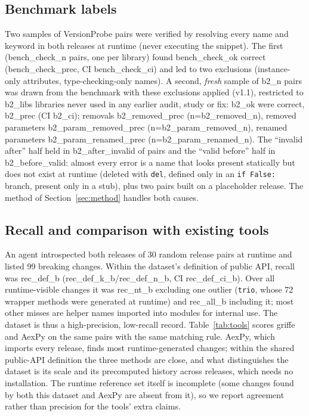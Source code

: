 \documentclass[10pt,twocolumn,letterpaper]{article}
\begin{document}
\subsection{Benchmark labels}\label{sec:benchlabels}
Two samples of VersionProbe pairs were verified by resolving every name and keyword in both releases at runtime
(never executing the snippet). The first ({{bench_check_n}} pairs, one per library) found {{bench_check_ok}} correct
({{bench_check_prec}}, CI {{bench_check_ci}}) and led to two exclusions (instance-only attributes, type-checking-only
names). A second, \emph{fresh} sample of {{b2_n}} pairs was drawn from the benchmark with these exclusions applied (v1.1), restricted to
{{b2_libs}} libraries never used in any earlier audit, study or fix: {{b2_ok}} were correct, {{b2_prec}} (CI {{b2_ci}});
removals {{b2_removed_prec}} (n={{b2_removed_n}}), removed parameters {{b2_param_removed_prec}}
(n={{b2_param_removed_n}}), renamed parameters {{b2_param_renamed_prec}} (n={{b2_param_renamed_n}}). The ``invalid after''
half held in {{b2_after_invalid}} of pairs and the ``valid before'' half in {{b2_before_valid}}: almost every error is a
name that looks present statically but does not exist at runtime (deleted with \texttt{del}, defined only in an
\texttt{if False:} branch, present only in a stub), plus two pairs built on a placeholder release. The method of Section~\ref{sec:method} handles both causes.

\subsection{Recall and comparison with existing tools}\label{sec:recall}
An agent introspected both releases of 30 random release pairs at runtime and listed 99 breaking changes. Within the
dataset's definition of public API, recall was {{rec_def_b}} ({{rec_def_k_b}}/{{rec_def_n_b}}, CI {{rec_def_ci_b}}). Over
all runtime-visible changes it was {{rec_nt_b}} excluding one outlier (\texttt{trio}, whose 72 wrapper methods were
generated at runtime) and {{rec_all_b}} including it; most other misses are helper names imported into modules for
internal use. The dataset is thus a high-precision, low-recall record. Table~\ref{tab:tools} scores griffe and AexPy on
the same pairs with the same matching rule. AexPy, which imports every release, finds most runtime-generated changes;
within the shared public-API definition the three methods are close, and what distinguishes the dataset is its scale
and its precomputed history across releases, which needs no installation. The runtime reference set itself is incomplete (some changes found by both this
dataset and AexPy are absent from it), so we report agreement rather than precision for the tools' extra claims.
\end{document}
